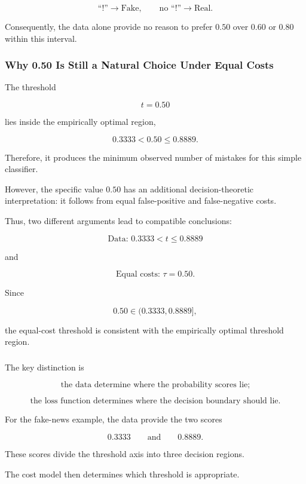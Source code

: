 \documentclass[11pt]{article}
\begin{document}
\[
\text{``!''}\rightarrow\text{Fake},
\qquad
\text{no ``!''}\rightarrow\text{Real}.
\]

Consequently, the data alone provide no reason to prefer $0.50$ over $0.60$ or
$0.80$ within this interval.

\subsubsection*{Why 0.50 Is Still a Natural Choice Under Equal Costs}

The threshold

\[
t=0.50
\]

lies inside the empirically optimal region,

\[
0.3333<0.50\leq0.8889.
\]

Therefore, it produces the minimum observed number of mistakes for this simple
classifier.

However, the specific value $0.50$ has an additional decision-theoretic
interpretation: it follows from equal false-positive and false-negative costs.

Thus, two different arguments lead to compatible conclusions:

\[
\boxed{
\text{Data: }
0.3333<t\leq0.8889
}
\]

and

\[
\boxed{
\text{Equal costs: }
\tau=0.50.
}
\]

Since

\[
0.50\in(0.3333,0.8889],
\]

the equal-cost threshold is consistent with the empirically optimal threshold
region.

\subsubsection*{}

The key distinction is

\[
\boxed{
\text{the data determine where the probability scores lie;}
}
\]

\[
\boxed{
\text{the loss function determines where the decision boundary should lie.}
}
\]

For the fake-news example, the data provide the two scores

\[
0.3333
\qquad\text{and}\qquad
0.8889.
\]

These scores divide the threshold axis into three decision regions.

The cost model then determines which threshold is appropriate.
\end{document}
